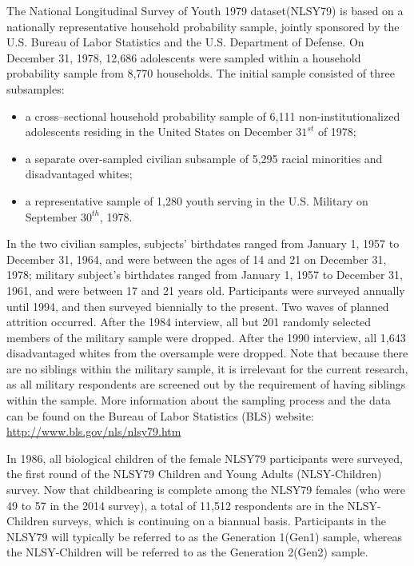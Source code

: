 The National Longitudinal Survey of Youth 1979 dataset(NLSY79) is based on a nationally representative household probability sample, jointly sponsored by the U.S. Bureau of Labor Statistics and the U.S. Department of Defense. On December 31, 1978, 12,686 adolescents were sampled within a household probability sample from 8,770 households. The initial sample consisted of three subsamples: \begin{itemize}\item a cross--sectional household probability sample of 6,111 non-institutionalized adolescents residing in the United States on December $31^{st}$ of 1978; \item a separate over-sampled civilian subsample of 5,295 racial minorities and disadvantaged whites; \item a representative sample of 1,280 youth serving in the U.S. Military on September $30^{th}$, 1978.\end{itemize} In the two civilian samples, subjects' birthdates ranged from January 1, 1957 to December 31, 1964, and were between the ages of 14 and 21 on December 31, 1978; military subject's birthdates ranged from January 1, 1957 to December 31, 1961, and were between 17 and 21 years old. Participants were surveyed annually until 1994, and then surveyed biennially to the present. Two waves of planned attrition occurred. After the 1984 interview, all but 201 randomly selected members of the military sample were dropped. After the 1990 interview, all 1,643 disadvantaged whites from the oversample were dropped. Note that because there are no siblings within the military sample, it is irrelevant for the current research, as all military respondents are screened out by the requirement of having siblings within the sample. More information about the sampling process and the data can be found on the Bureau of Labor Statistics (BLS) website: \url{http://www.bls.gov/nls/nlsy79.htm}

In 1986, all biological children of the female NLSY79 participants were surveyed, the first round of the NLSY79 Children and Young Adults (NLSY-Children) survey. Now that childbearing is complete among the NLSY79 females (who were 49 to 57 in the 2014 survey), a total of 11,512 respondents are in the NLSY-Children surveys, which is continuing on a biannual basis. Participants in the NLSY79 will typically be referred to as the Generation 1(Gen1) sample, whereas the NLSY-Children will be referred to as the Generation 2(Gen2) sample.